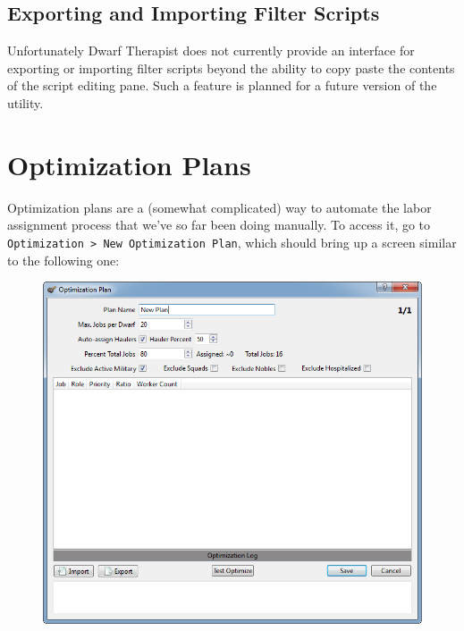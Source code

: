 \documentclass[]{article}
\newcommand{\legacy}[1] {
\begin{center}
\colorbox{legacy-content}{
\begin{minipage}[t]{0.95\linewidth}
#1
\end{minipage}
}
\end{center}
}
\begin{document}
\subsection{Exporting and Importing Filter Scripts}
\label{sec:Exporting and Importing Filter Scripts}

Unfortunately Dwarf Therapist does not currently provide an interface for exporting or importing filter
scripts beyond the ability to copy paste the contents of the script editing pane. Such a feature is
planned for a future version of the utility.

\newpage
\section{Optimization Plans}
\label{sec:Optimization Plans}


Optimization plans are a (somewhat complicated) way to automate the labor assignment process that we've
so far been doing manually. To access it, go to \texttt{Optimization > New Optimization Plan}, which
should bring up a screen similar to the following one:

\begin{figure}[h!]
\centering
\includegraphics[width=\linewidth]{Sec4Fig5}
\end{figure}
\end{document}
